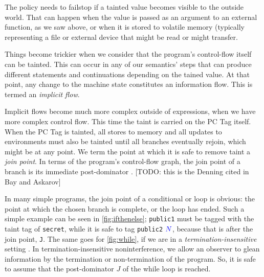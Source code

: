 \documentclass{llncs}
\begin{document}
The policy needs to failstop if a tainted value becomes visible to the outside world.
That can happen when the value is passed as an argument to an external function, as we
saw above, or when it is stored to volatile memory (typically representing a file or external
device that might be read or might transfer.

  

Things become trickier when we consider that the program's control-flow itself can be tainted.
This can occur in any of our semantics' steps that can produce different statements and continuations
depending on the tained value. At that point, any change to the machine state constitutes
an information flow. This is termed an {\em implicit flow}.

Implicit flows become much more complex outside of expressions, when we have more
complex control flow. This time the taint is carried on the PC Tag itself.
When the PC Tag is tainted, all stores to memory and all updates to environments must
also be tainted until all branches eventually rejoin, which might be at any point.
We term the point at which it is safe to remove taint a {\it join point}.
In terms of the program's control-flow graph, the
join point of a branch is its immediate post-dominator \cite{}.
[TODO: this is the Denning cited in Bay and Askarov]

In many simple programs, the join point of a conditional or loop is obvious:
the point at which the chosen branch is complete, or the loop has ended.
Such a simple example can be seen in \cref{fig:ifthenelse}; {\tt public1} must be
tagged with the taint tag of {\tt secret}, while it is safe to tag {\tt public2}
\({\color{blue} N}\), because that is after the join point, {\tt J}. The same goes for \cref{fig:while},
if we are in a {\em termination-insensitive} setting \cite{Askarov08:TINILeaks}.
In termination-insensitive noninterference, we allow
an observer to glean information by the termination or non-termination of
the program. So, it is safe to assume that the post-dominator \(J\)
of the while loop is reached.
\end{document}
